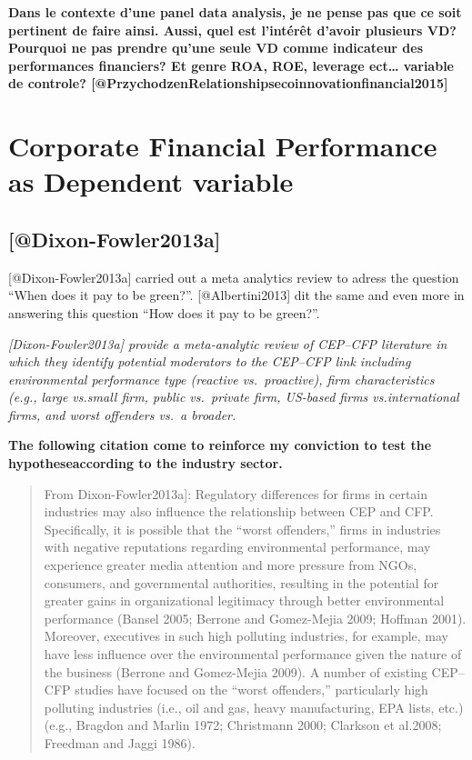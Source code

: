 \documentclass[]{article}
\begin{document}
\textbf{Dans le contexte d'une panel data analysis, je ne pense pas que
ce soit pertinent de faire ainsi. Aussi, quel est l'intérêt d'avoir
plusieurs VD? Pourquoi ne pas prendre qu'une seule VD comme indicateur
des performances financiers? Et genre ROA, ROE, leverage ect\ldots{}
variable de controle?
{[}@PrzychodzenRelationshipsecoinnovationfinancial2015{]}}

\section{Corporate Financial Performance as Dependent
variable}\label{corporate-financial-performance-as-dependent-variable}

\subsection{{[}@Dixon-Fowler2013a{]}}\label{dixon-fowler2013a}

{[}@Dixon-Fowler2013a{]} carried out a meta analytics review to adress
the question ``When does it pay to be green?''. {[}@Albertini2013{]} dit
the same and even more in answering this question ``How does it pay to
be green?''.

\emph{{[}Dixon-Fowler2013a{]} provide a meta-analytic review of CEP--CFP
literature in which they identify potential moderators to the CEP--CFP
link including environmental performance type (reactive vs.~proactive),
firm characteristics (e.g., large vs.small firm, public vs.~private
firm, US-based firms vs.international firms, and worst offenders vs.~a
broader.}

\textbf{The following citation come to reinforce my conviction to test
the hypotheseaccording to the industry sector.}

\begin{quote}
From Dixon-Fowler2013a{]}: Regulatory differences for firms in certain
industries may also influence the relationship between CEP and CFP.
Specifically, it is possible that the ``worst offenders,'' firms in
industries with negative reputations regarding environmental
performance, may experience greater media attention and more pressure
from NGOs, consumers, and governmental authorities, resulting in the
potential for greater gains in organizational legitimacy through better
environmental performance (Bansel 2005; Berrone and Gomez-Mejia 2009;
Hoffman 2001). Moreover, executives in such high polluting industries,
for example, may have less influence over the environmental performance
given the nature of the business (Berrone and Gomez-Mejia 2009). A
number of existing CEP--CFP studies have focused on the ``worst
offenders,'' particularly high polluting industries (i.e., oil and gas,
heavy manufacturing, EPA lists, etc.) (e.g., Bragdon and Marlin 1972;
Christmann 2000; Clarkson et al.2008; Freedman and Jaggi 1986).
\end{quote}
\end{document}
